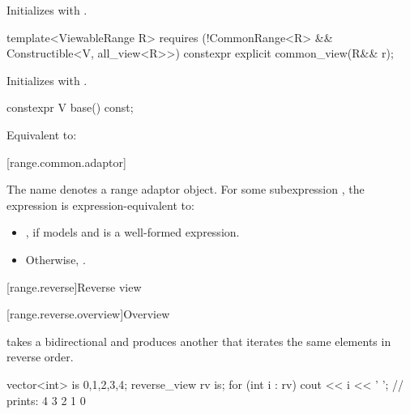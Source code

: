 \begin{itemdescr}
\pnum
\effects Initializes  with .
\end{itemdescr}

%
\begin{itemdecl}
template<ViewableRange R>
  requires (!CommonRange<R> && Constructible<V, all_view<R>>)
constexpr explicit common_view(R&& r);
\end{itemdecl}

\begin{itemdescr}
\pnum
\effects Initializes  with .
\end{itemdescr}

%
\begin{itemdecl}
constexpr V base() const;
\end{itemdecl}

\begin{itemdescr}
\pnum
\effects Equivalent to: 
\end{itemdescr}

[range.common.adaptor]{}

\pnum
The name  denotes a
range adaptor object.
For some subexpression ,
the expression  is expression-equivalent to:

\begin{itemize}
\item {},
  if  models 
  and  is a well-formed expression.

\item Otherwise, .
\end{itemize}


[range.reverse]{Reverse view}

[range.reverse.overview]{Overview}

\pnum
{} takes a bidirectional  and produces
another  that iterates the same elements in reverse order.

\pnum
\begin{example}
\begin{codeblock}
vector<int> is {0,1,2,3,4};
reverse_view rv {is};
for (int i : rv)
  cout << i << ' '; // prints: 4 3 2 1 0
\end{codeblock}
\end{example}

